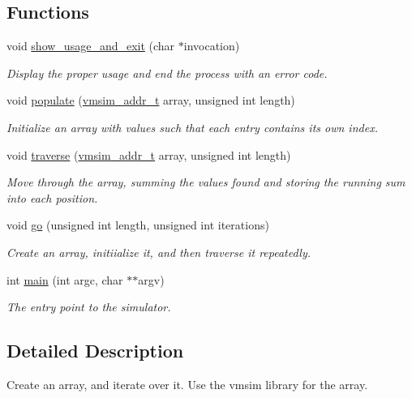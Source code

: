 \subsection*{Functions}
\begin{DoxyCompactItemize}
\item 
void \hyperlink{iterative-walk_8c_a4c03bd347423374d85d921056bd14e5c}{show\+\_\+usage\+\_\+and\+\_\+exit} (char $\ast$invocation)
\begin{DoxyCompactList}\small\item\em Display the proper usage and end the process with an error code. \end{DoxyCompactList}\item 
void \hyperlink{iterative-walk_8c_a92da6e3eac55a76919d70a529698cba3}{populate} (\hyperlink{vmsim_8h_a1ad4b372d1694c5c19ee7ccada09d807}{vmsim\+\_\+addr\+\_\+t} array, unsigned int length)
\begin{DoxyCompactList}\small\item\em Initialize an array with values such that each entry contains its own index. \end{DoxyCompactList}\item 
void \hyperlink{iterative-walk_8c_a8934a56f7be8726dbed732e41a1639ed}{traverse} (\hyperlink{vmsim_8h_a1ad4b372d1694c5c19ee7ccada09d807}{vmsim\+\_\+addr\+\_\+t} array, unsigned int length)
\begin{DoxyCompactList}\small\item\em Move through the array, summing the values found and storing the running sum into each position. \end{DoxyCompactList}\item 
void \hyperlink{iterative-walk_8c_a2e85b0f86f91c0581fcd8e5bd6764568}{go} (unsigned int length, unsigned int iterations)
\begin{DoxyCompactList}\small\item\em Create an array, initiialize it, and then traverse it repeatedly. \end{DoxyCompactList}\item 
int \hyperlink{iterative-walk_8c_a3c04138a5bfe5d72780bb7e82a18e627}{main} (int argc, char $\ast$$\ast$argv)
\begin{DoxyCompactList}\small\item\em The entry point to the simulator. \end{DoxyCompactList}\end{DoxyCompactItemize}


\subsection{Detailed Description}
Create an array, and iterate over it. Use the {\ttfamily vmsim} library for the array. 

